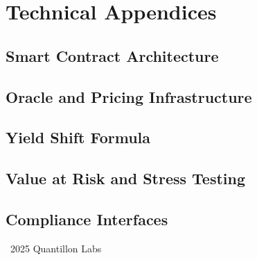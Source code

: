 \documentclass[12pt,a4paper]{report}
\begin{document}
\chapter{Technical Appendices}
\section{Smart Contract Architecture}
\section{Oracle and Pricing Infrastructure}
\section{Yield Shift Formula}
\section{Value at Risk and Stress Testing}
\section{Compliance Interfaces}

\vfill
\begin{center}
\small \textcopyright\ 2025 Quantillon Labs
\end{center}
\end{document}
